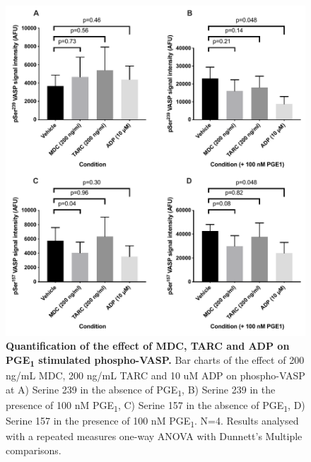 \documentclass[11pt,twoside]{bristolthesis}
\begin{document}
\begin{figure}

{\centering \includegraphics{figure/Chemokines/Layouts/MDC_TARC_WB_VASP} 

}

\caption[Quantification of the effect of MDC, TARC and ADP on PGE\textsubscript{1} stimulated phospho-VASP.]{\textbf{Quantification of the effect of MDC, TARC and ADP on PGE\textsubscript{1} stimulated phospho-VASP.} Bar charts of the effect of 200 ng/mL MDC, 200 ng/mL TARC and 10 uM ADP on phospho-VASP at A) Serine 239 in the absence of PGE\textsubscript{1}, B) Serine 239 in the presence of 100 nM PGE\textsubscript{1}, C) Serine 157 in the absence of PGE\textsubscript{1}, D) Serine 157 in the presence of 100 nM PGE\textsubscript{1}. N=4. Results analysed with a repeated measures one-way ANOVA with Dunnett's Multiple comparisons.}\label{fig:MDC-TARC-wp-VASP-bar}
\end{figure}
\end{document}
